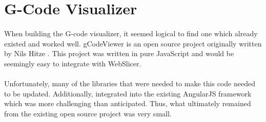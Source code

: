 \section{G-Code Visualizer}
\paragraph{}
When building the G-code visualizer, it seemed logical to find one which already existed and worked well.
gCodeViewer is an open source project originally written by Nils Hitze \citep{hitzeViewer-2015}.
This project was written in pure JavaScript and would be seemingly easy to integrate with WebSlicer.

\paragraph{}
Unfortunately, many of the libraries that were needed to make this code needed to be updated.
Additionally, integrated into the existing AngularJS framework which was more challenging than anticipated.
Thus, what ultimately remained from the existing open source project was very small.
